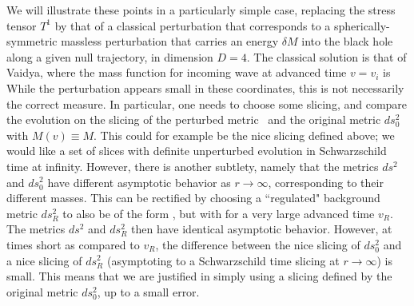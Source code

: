 We will illustrate these points in a particularly simple case, replacing the stress tensor $T^1$ by that of a classical perturbation that corresponds to a spherically-symmetric massless perturbation that carries an energy $\delta M$ into the black hole along a given null trajectory, in dimension $D=4$.  The classical solution is that of Vaidya,
%
\eqn{}
%
where the mass function for incoming wave at advanced time $v=v_i$ is
%
\eqn{}
%
While the perturbation appears small in these coordinates, this is not necessarily the correct measure.  In particular, one needs to choose some slicing, and compare the evolution on the slicing of the perturbed metric \vsoln\ and the original metric $ds_0^2$ with $M(v)\equiv M$.  This could for example be the nice slicing defined above; we would like a set of slices with definite unperturbed evolution in Schwarzschild time at infinity.  However, there is another subtlety, namely that the metrics $ds^2$ and $ds_0^2$ have different asymptotic behavior as $r\rightarrow\infty$, corresponding to their different masses.  This can be rectified by choosing a ``regulated" background metric $ds_R^2$ to also be of the form \vsoln, but with 
%
\eqn{}
%
for a very large  advanced time $v_R$.  The metrics $ds^2$ and $ds_R^2$ then have identical asymptotic behavior.  However, at times short as compared to $v_R$, the difference between the nice slicing of $ds_0^2$ and a nice slicing of $ds_R^2$ (asymptoting to a Schwarzschild time slicing at $r\rightarrow\infty$)  is small.  This means that we are justified in simply using a slicing defined by the original metric $ds_0^2$, up to a small error.

